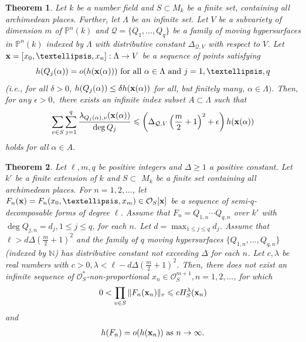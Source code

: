 \documentclass[10pt,a4paper]{amsart}
\newtheorem{theorem}{Theorem}
\renewcommand{\P}{{\mathbb{P}}}
\begin{document}
\begin{theorem}\label{2.4} Let $k$ be a number field and $S \subset M_k$ be a finite set, containing all archimedean places. Further, let $\Lambda$ be an infinite set. Let $V$ be a subvariety of dimension $m$ of $\P^n(k)$ and $\mathcal Q=\{Q_1,\dots, Q_q\}$ be a family of moving hypersurfaces in $\P^n(k)$ indexed by $\Lambda$ with distributive constant $\Delta_{\mathcal Q,V}$ with respect to $V$. Let ${\bf x}=[x_0,\ldots,x_n]:\Lambda \to V$ be a sequence of points satisfying
$$h(Q_j(\alpha))=o(h({\bf x}(\alpha))) \text{ for all }\alpha\in\Lambda \text{ and }j=1, \dots,q$$
(i.e., for all $\delta>0$,  $h(Q_j(\alpha))\leq\delta h({\bf x}(\alpha))$ for all, but finitely many, $\alpha\in \Lambda).$
Then, for any $\epsilon >0,$ there exists an infinite index subset $A\subset \Lambda$ such that
\begin{eqnarray*} \sum_{v\in S}\sum_{j=1}^{q}\frac{\lambda_{Q_j(\alpha), v}({\bf x}(\alpha))}{\deg Q_j}\leqslant \left(\Delta_{\mathcal Q,V}\left(\frac{m}{2}+1\right)^2+\epsilon\right)h({\bf x}(\alpha)
)\end{eqnarray*}
holds for all $\alpha \in A.$
\end{theorem}

\begin{theorem}\label{1.1}
Let $\ell,m,q$ be positive integers and $\Delta\ge 1$ a positive constant. Let $k'$ be a finite extension of $k$ and $S \subset$ $M_{k}$ be a finite set containing all archimedean places. For $n=1,2, \ldots$, let $F_{n}({\bf x})=F_{n}(x_{0}, \ldots, x_{m}) \in \mathcal{O}_{S}[{\bf x}]$ be a sequence of semi-$q$-decomposable forms of degree $\ell$. Assume that $F_n=Q_{1,n} \cdots Q_{q,n}$ over $k'$ with $\deg Q_{j,n}=d_j, 1 \leqslant j \leqslant q$, for each $n$. Let $d=\max _{1 \leqslant j \leqslant q}d_j$. Assume that $\ell>d\Delta\left(\frac{m}{2}+1\right)^2$ and the family of $q$ moving hypersurfaces $\{Q_{1,n}, \ldots ,Q_{q,n}\}$ (indexed by $\mathbb N$) has distributive constant not exceeding $\Delta$ for each $n$. Let $c, \lambda$ be real numbers with $c>0, \lambda<\ell-d\Delta\left(\frac{m}{2}+1\right)^{2}$. Then, there does not exist an infinite sequence of $\mathcal{O}_{S}^{*}$-non-proportional $x_{n} \in \mathcal{O}_{S}^{m+1}, n=1,2, \ldots$, for which
\begin{align}\label{1.2}
0<\prod_{v \in S}\|F_{n}({\bf x}_{n})\|_{v} \leqslant c H_{S}^{\lambda}({\bf x}_{n})
\end{align}
and
\begin{align}\label{1.3}
h(F_{n})=o(h({\bf x}_{n})) \text { as } n\rightarrow \infty.
\end{align}
\end{theorem}
\end{document}
